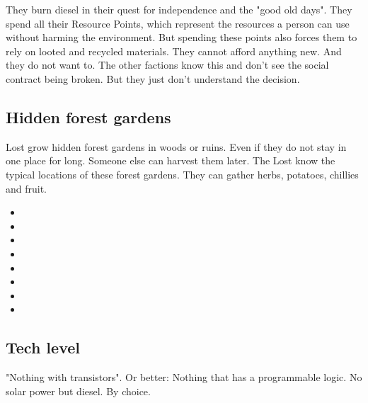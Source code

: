 They burn diesel in their quest for independence and the "good old days". They spend all their Resource Points, which represent the resources a person can use without harming the environment. But spending these points also forces them to rely on looted and recycled materials. They cannot afford anything new. And they do not want to.
The other factions know this and don't see the social contract being broken. But they just don't understand the decision.


\subsection{Hidden forest gardens}

Lost grow hidden forest gardens in woods or ruins. Even if they do not stay in one place for long. Someone else can harvest them later.
The Lost know the typical locations of these forest gardens. They can gather herbs, potatoes, chillies and fruit.

\begin{losttalk}[title=Not Reading the Classics]
    \begin{itemize}
        \item {}
        \item {}
        \item {}
        \item {}
        \item {}
        \item {}
        \item {}
        \item {}
    \end{itemize}
\end{losttalk}

\subsection{Tech level}

"Nothing with transistors". Or better: Nothing that has a programmable logic. No solar power but diesel. By choice.

